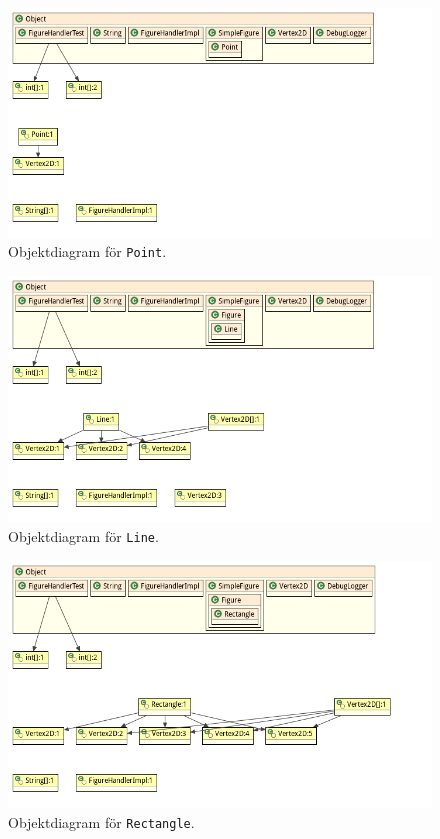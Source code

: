 \begin{figure}[ht]
\centering
\includegraphics[width=\linewidth]{diagram/figureHandlerTest_Point_Object-Diagram.png}
\caption{Objektdiagram för \texttt{Point}.}
\label{fig:obj-point}
\end{figure}

\begin{figure}[ht]
\centering
\includegraphics[width=\linewidth]{diagram/figureHandlerTest_Line_Object-Diagram.png}
\caption{Objektdiagram för \texttt{Line}.}
\label{fig:obj-line}
\end{figure}

\begin{figure}[ht]
\centering
\includegraphics[width=\linewidth]{diagram/figureHandlerTest_Rectangle_Object-Diagram.png}
\caption{Objektdiagram för \texttt{Rectangle}.}
\label{fig:obj-rect}
\end{figure}

